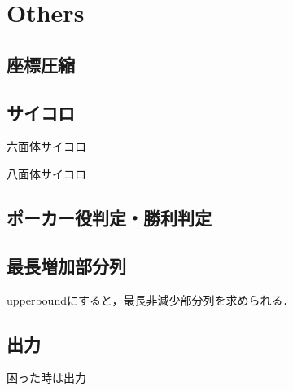 \section{Others}

\subsection{座標圧縮}


\subsection{サイコロ}
六面体サイコロ

八面体サイコロ


\subsection{ポーカー役判定・勝利判定}


\subsection{最長増加部分列}
upperboundにすると，最長非減少部分列を求められる．


\subsection{出力}
困った時は出力

